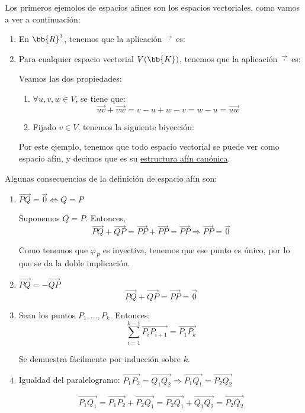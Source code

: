 \begin{ejemplo}
    Los primeros ejemolos de espacios afines son los espacios vectoriales, como vamos a ver a continuación:
    \begin{enumerate}
        \item En $\bb{R}^3$, tenemos que la aplicación $\vec{\cdot}$ es:

        \item Para cualquier espacio vectorial $V(\bb{K})$, tenemos que la aplicación $\vec{\cdot}$ es:

        Veamos las dos propiedades:
        \begin{enumerate}
            \item $\forall u,v,w\in V$, se tiene que:
            \begin{equation*}
                \vec{uv} + \vec{vw} = v-u+w-v = w-u = \vec{uw}
            \end{equation*}

            \item Fijado $v\in V$, tenemos la siguiente biyección:
        \end{enumerate}

        Por este ejemplo, tenemos que todo espacio vectorial se puede ver como espacio afín, y decimos que es su \ul{estructura afín canónica}.
    \end{enumerate}
\end{ejemplo}


Algunas consecuencias de la definición de espacio afín son:
\begin{enumerate}
    \item $\vec{PQ}=\vec{0}\Longleftrightarrow Q=P$
    
    Suponemos $Q=P$. Entonces,
        $$\vec{PQ}+\vec{QP}=\vec{PP}+\vec{PP}=\vec{PP}\Longrightarrow \vec{PP}=\vec{0}$$

    Como tenemos que $\varphi_P$ es inyectiva, tenemos que ese punto es único, por lo que se da la doble implicación.
    
    \item $\vec{PQ}=-\vec{QP}$
    $$\vec{PQ}+\vec{QP}=\vec{PP}=\vec{0}$$

    \item Sean los puntos $P_1,\dots, P_k$. Entonces:
    $$\sum_{i=1}^{k-1}\vec{P_iP_{i+1}}=\vec{P_1P_k}$$

    Se demuestra fácilmente por inducción sobre $k$.

    \item Igualdad del paralelogramo: $\vec{P_1P_2}=\vec{Q_1Q_2}\Longrightarrow \vec{P_1Q_1}=\vec{P_2Q_2}$

    $$\vec{P_1Q_1}=\vec{P_1P_2} + \vec{P_2Q_1} = \vec{P_2Q_1} + \vec{Q_1Q_2} = \vec{P_2Q_2}$$
\end{enumerate}

